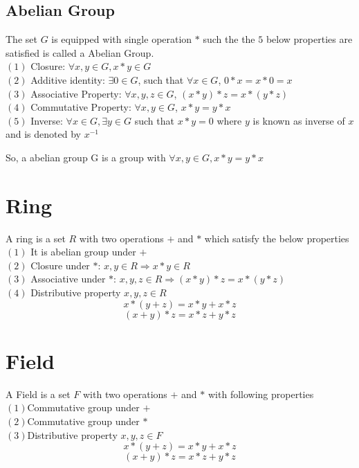 \documentclass[12pt,a4paper]{report}
\begin{document}
\subsection{Abelian Group}
The set $G$ is equipped with  single operation $*$ such the the $5$ below properties are satisfied is called a Abelian Group.\\
$(1)$ Closure: $\forall x,y \in G, x*y \in G$ \\
$(2)$ Additive identity: $\exists 0 \in G$, such that $ \forall x \in G$, $ 0*x=x*0=x$\\
$(3)$ Associative Property: $ \forall x,y,z \in G$, $(x*y)*z=x*(y*z)$ \\
$(4)$ Commutative Property: $ \forall x,y \in G$, $x*y=y*x$ \\
$(5)$ Inverse: $ \forall x \in G, \exists y \in G$ such that $x*y=0$ where $y$ is known as inverse of $x$ and is denoted by $x^{-1}$	
	
So, a abelian group G is a group with $\forall x,y \in G, x*y=y*x$
\cleardoublepage
	
\section{Ring}
A ring is a set $R$ with two operations $+$ and $*$ which satisfy the below properties\\
$(1)$ It is abelian group under $+$ \\
$(2)$ Closure under $*$:  $x,y \in R \Rightarrow	x*y \in R $  \\
$(3)$ Associative under $*$: $x,y,z \in R \Rightarrow	(x*y)*z=x*(y*z) $\\
$(4)$ Distributive property $x,y,z \in R$
$$x*(y+z)=x*y+x*z$$ $$(x+y)*z=x*z+y*z$$
	
\section{Field}
A Field is a set $F$ with two operations $+$ and $*$ with following properties \\
$(1)$Commutative group under $+$\\
$(2)$Commutative group under $*$\\
$(3)$Distributive property $x,y,z \in F$
$$x*(y+z)=x*y+x*z$$ $$(x+y)*z=x*z+y*z$$
\end{document}
